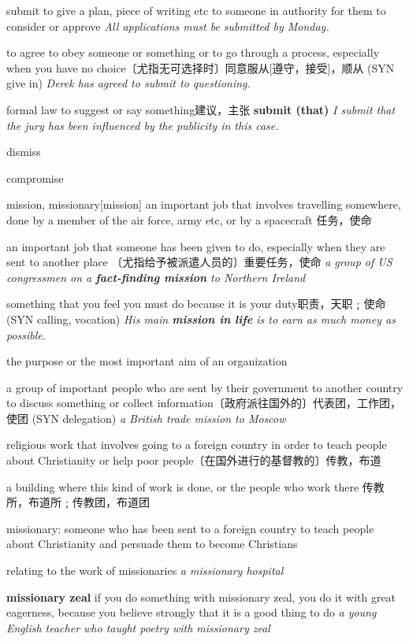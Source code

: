 \begin{DefWord}{submit}
    to give a plan, piece of writing etc to someone in authority for them to consider or approve
    \textit{All applications must be submitted by Monday.}

    to agree to obey someone or something or to go through a process, especially when you have no choice〔尤指无可选择时〕同意服从[遵守，接受]，顺从 (SYN  give in)
    \textit{Derek has agreed to submit to questioning.}

    formal law to suggest or say something建议，主张
    \textbf{submit (that)}
    \textit{I submit that the jury has been influenced by the publicity in this case.}
\end{DefWord}

\begin{DefWord}{dismiss}
\end{DefWord}

\begin{DefWord}{compromise}
\end{DefWord}

\begin{DefWord}{mission, missionary}[mission]
    an important job that involves travelling somewhere, done by a member of the air force, army etc, or by a spacecraft 任务，使命

    an important job that someone has been given to do, especially when they are sent to another place 〔尤指给予被派遣人员的〕重要任务，使命
    \textit{a group of US congressmen on a \textbf{fact-finding mission} to Northern Ireland}

    something that you feel you must do because it is your duty职责，天职﹔使命 (SYN  calling, vocation)
    \textit{His main \textbf{mission in life} is to earn as much money as possible.}

    the purpose or the most important aim of an organization

    a group of important people who are sent by their government to another country to discuss something or collect information〔政府派往国外的〕代表团，工作团，使团 (SYN  delegation)
    \textit{a British trade mission to Moscow}

    religious work that involves going to a foreign country in order to teach people about Christianity or help poor people〔在国外进行的基督教的〕传教，布道

    a building where this kind of work is done, or the people who work there 传教所，布道所﹔传教团，布道团

    missionary: someone who has been sent to a foreign country to teach people about Christianity and persuade them to become Christians

    relating to the work of missionaries
    \textit{a missionary hospital}

    \textbf{missionary zeal} if you do something with missionary zeal, you do it with great eagerness, because you believe strongly that it is a good thing to do
    \textit{a young English teacher who taught poetry with missionary zeal}
\end{DefWord}

